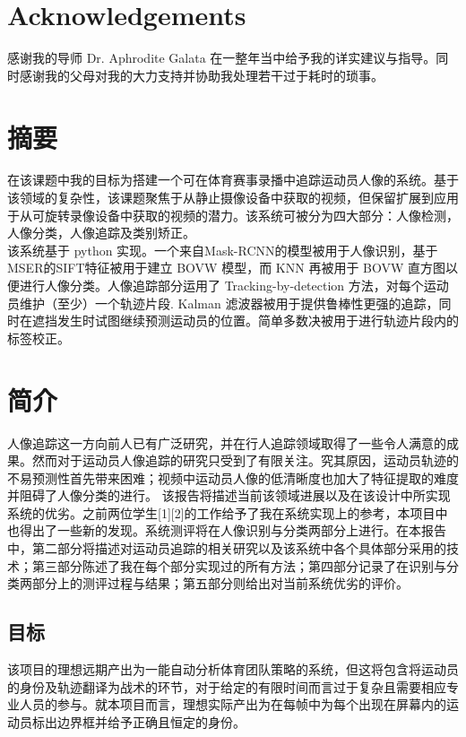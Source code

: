 \documentclass{article}
\begin{document}
\section*{Acknowledgements}
感谢我的导师 Dr. Aphrodite Galata 在一整年当中给予我的详实建议与指导。同时感谢我的父母对我的大力支持并协助我处理若干过于耗时的琐事。
\newpage

\section*{摘要}
在该课题中我的目标为搭建一个可在体育赛事录播中追踪运动员人像的系统。基于该领域的复杂性，该课题聚焦于从静止摄像设备中获取的视频，但保留扩展到应用于从可旋转录像设备中获取的视频的潜力。该系统可被分为四大部分：人像检测，人像分类，人像追踪及类别矫正。\\
该系统基于 python 实现。一个来自Mask-RCNN的模型被用于人像识别，基于MSER的SIFT特征被用于建立 BOVW 模型，而 KNN 再被用于 BOVW 直方图以便进行人像分类。人像追踪部分运用了 Tracking-by-detection 方法，对每个运动员维护（至少）一个轨迹片段. Kalman 滤波器被用于提供鲁棒性更强的追踪，同时在遮挡发生时试图继续预测运动员的位置。简单多数决被用于进行轨迹片段内的标签校正。
\newpage

\tableofcontents
\newpage
\listoffigures
\newpage
\listoftables
\newpage

\section{简介}
人像追踪这一方向前人已有广泛研究，并在行人追踪领域取得了一些令人满意的成果。然而对于运动员人像追踪的研究只受到了有限关注。究其原因，运动员轨迹的不易预测性首先带来困难；视频中运动员人像的低清晰度也加大了特征提取的难度并阻碍了人像分类的进行。
该报告将描述当前该领域进展以及在该设计中所实现系统的优劣。之前两位学生[1][2]的工作给予了我在系统实现上的参考，本项目中也得出了一些新的发现。系统测评将在人像识别与分类两部分上进行。在本报告中，第二部分将描述对运动员追踪的相关研究以及该系统中各个具体部分采用的技术；第三部分陈述了我在每个部分实现过的所有方法；第四部分记录了在识别与分类两部分上的测评过程与结果；第五部分则给出对当前系统优劣的评价。
\subsection{目标}
该项目的理想远期产出为一能自动分析体育团队策略的系统，但这将包含将运动员的身份及轨迹翻译为战术的环节，对于给定的有限时间而言过于复杂且需要相应专业人员的参与。就本项目而言，理想实际产出为在每帧中为每个出现在屏幕内的运动员标出边界框并给予正确且恒定的身份。
\end{document}

